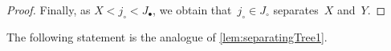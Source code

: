 \documentclass{amsart}
\theoremstyle{definition}
\begin{document}
\begin{proof}
Finally, as $X < j_\circ < J_\bullet$, we obtain that~$j_\circ \in J_\circ$ separates~$X$ and~$Y$.
\end{proof}

The following statement is the analogue of \cref{lem:separatingTree1}.
\end{document}
